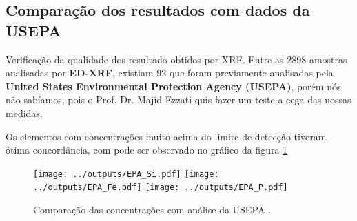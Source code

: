 \subsection{Comparação dos resultados com dados da USEPA}

Verificação da qualidade dos resultado obtidos por XRF.
Entre as 2898 amostras analisadas por \textbf{ED-XRF}, existiam 92 que foram 
previamente analisadas pela \textbf{United States Environmental Protection 
Agency (USEPA)}, porém nós não sabíamos, pois o Prof. Dr. Majid Ezzati quis 
fazer um teste a cega das nossas medidas. 

Os elementos com concentrações muito acima do limite de detecção tiveram ótima
concordância, com pode ser observado no gráfico da figura \ref{fig:epa} 

\begin{figure}[H]
  \centering
    \texttt{[image: ../outputs/EPA\_Si.pdf]}
    \texttt{[image: ../outputs/EPA\_Fe.pdf]}
    \texttt{[image: ../outputs/EPA\_P.pdf]}
  \caption{Comparação das concentrações com análise da USEPA \label{fig:epa}.}
\end{figure}
